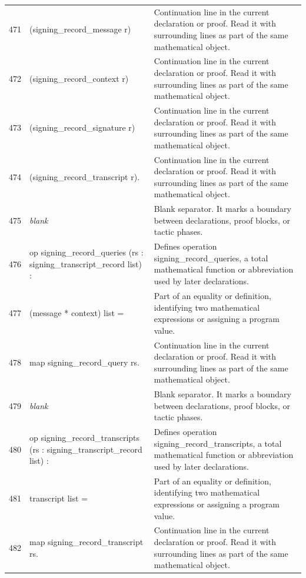 \documentclass[10pt]{article}
\begin{document}
\begin{longtable}{r L{0.53\textwidth} L{0.37\textwidth}}
471 & {\ttfamily\scriptsize     (signing\_record\_message r)} & Continuation line in the current declaration or proof.  Read it with surrounding lines as part of the same mathematical object. \\
472 & {\ttfamily\scriptsize     (signing\_record\_context r)} & Continuation line in the current declaration or proof.  Read it with surrounding lines as part of the same mathematical object. \\
473 & {\ttfamily\scriptsize     (signing\_record\_signature r)} & Continuation line in the current declaration or proof.  Read it with surrounding lines as part of the same mathematical object. \\
474 & {\ttfamily\scriptsize     (signing\_record\_transcript r).} & Continuation line in the current declaration or proof.  Read it with surrounding lines as part of the same mathematical object. \\
475 & {\ttfamily\scriptsize \emph{blank}} & Blank separator.  It marks a boundary between declarations, proof blocks, or tactic phases. \\
476 & {\ttfamily\scriptsize op signing\_record\_queries (rs : signing\_transcript\_record list) :} & Defines operation signing\_record\_queries, a total mathematical function or abbreviation used by later declarations. \\
477 & {\ttfamily\scriptsize   (message * context) list =} & Part of an equality or definition, identifying two mathematical expressions or assigning a program value. \\
478 & {\ttfamily\scriptsize   map signing\_record\_query rs.} & Continuation line in the current declaration or proof.  Read it with surrounding lines as part of the same mathematical object. \\
479 & {\ttfamily\scriptsize \emph{blank}} & Blank separator.  It marks a boundary between declarations, proof blocks, or tactic phases. \\
480 & {\ttfamily\scriptsize op signing\_record\_transcripts (rs : signing\_transcript\_record list) :} & Defines operation signing\_record\_transcripts, a total mathematical function or abbreviation used by later declarations. \\
481 & {\ttfamily\scriptsize   transcript list =} & Part of an equality or definition, identifying two mathematical expressions or assigning a program value. \\
482 & {\ttfamily\scriptsize   map signing\_record\_transcript rs.} & Continuation line in the current declaration or proof.  Read it with surrounding lines as part of the same mathematical object. \\

\end{longtable}
\end{document}
